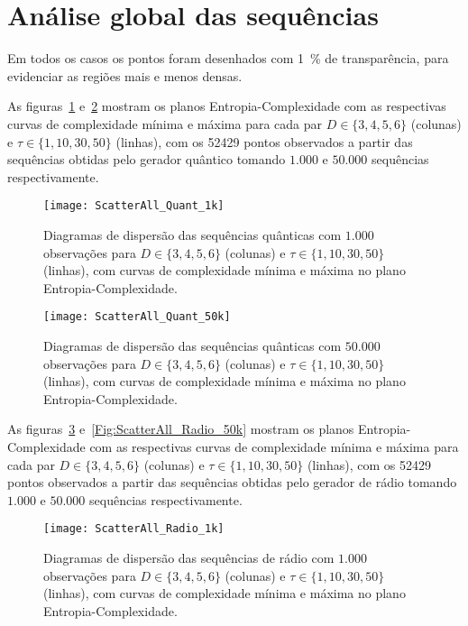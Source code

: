 \section{Análise global das sequências}

Em todos os casos os pontos foram desenhados com \SI{1}{\percent} de transparência, para evidenciar as regiões mais e menos densas.

As figuras~\ref{Fig:ScatterAll_Quant_1k} e~\ref{Fig:ScatterAll_Quant_50k} mostram os planos Entropia-Complexidade com as respectivas curvas de complexidade mínima e máxima para cada par $D\in\{3, 4, 5, 6\}$ (colunas) e $\tau\in\{1, 10, 30, 50\}$ (linhas), com os \num{52429} pontos observados a partir das sequências obtidas pelo gerador quântico tomando $1.000$ e $50.000$ sequências respectivamente.


\begin{figure}[hbt]
	\centering
	\texttt{[image: ScatterAll\_Quant\_1k]}
	\caption{Diagramas de dispersão das sequências quânticas com $1.000$ observações para $D\in\{3, 4, 5, 6\}$ (colunas) e $\tau\in\{1, 10, 30, 50\}$ (linhas), com curvas de complexidade mínima e máxima no plano Entropia-Complexidade.}\label{Fig:ScatterAll_Quant_1k}
\end{figure}

\begin{figure}[hbt]
	\centering
	\texttt{[image: ScatterAll\_Quant\_50k]}
	\caption{Diagramas de dispersão das sequências quânticas com $50.000$ observações para $D\in\{3, 4, 5, 6\}$ (colunas) e $\tau\in\{1, 10, 30, 50\}$ (linhas), com curvas de complexidade mínima e máxima no plano Entropia-Complexidade.}\label{Fig:ScatterAll_Quant_50k}
\end{figure}

As figuras~\ref{Fig:ScatterAll_Radio_1k} e~\ref{Fig:ScatterAll_Radio_50k} mostram os planos Entropia-Complexidade com as respectivas curvas de complexidade mínima e máxima para cada par $D\in\{3, 4, 5, 6\}$ (colunas) e $\tau\in\{1, 10, 30, 50\}$ (linhas), com os \num{52429} pontos observados a partir das sequências obtidas pelo gerador de rádio tomando $1.000$ e $50.000$ sequências respectivamente.


\begin{figure}[hbt]
	\centering
	\texttt{[image: ScatterAll\_Radio\_1k]}
	\caption{Diagramas de dispersão das sequências de rádio com $1.000$ observações para $D\in\{3, 4, 5, 6\}$ (colunas) e $\tau\in\{1, 10, 30, 50\}$ (linhas), com curvas de complexidade mínima e máxima no plano Entropia-Complexidade.}\label{Fig:ScatterAll_Radio_1k}
\end{figure}

